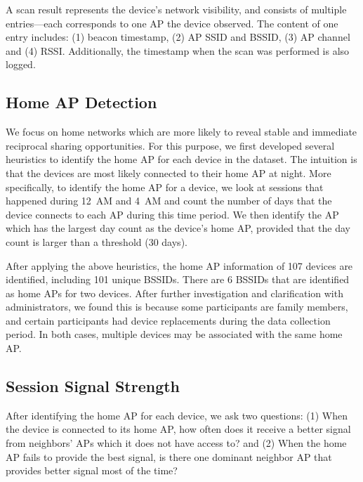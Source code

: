 A \wifi{} scan result represents the device's network visibility, and consists of
multiple entries---each corresponds to one \wifi{} AP the device
observed. The content of one entry includes: (1) beacon timestamp, (2) AP SSID
and BSSID, (3) AP channel and (4) RSSI. Additionally, the timestamp when the
scan was performed is also logged.

\subsection{Home AP Detection}
\label{subsec:homeap}

We focus on home \wifi{} networks which are more likely to reveal stable and
immediate reciprocal sharing opportunities. For this purpose, we first developed
several heuristics to identify the home AP for each device in the dataset. The
intuition is that the devices are most likely connected to their home AP at
night. More specifically, to identify the home AP for a device, we look at
\wifi{} sessions that happened during 12~AM and 4~AM and count the number of
days that the device connects to each AP during this time period. We then
identify the AP which has the largest day count as the device's home AP,
provided that the day count is larger than a threshold (30 days).

After applying the above heuristics, the home AP information of 107 devices are
identified, including 101 unique BSSIDs. There are 6 BSSIDs that are identified
as home APs for two devices. After further investigation and clarification with
\PhoneLab{} administrators, we found this is because some participants are family
members, and certain participants had device replacements during the data
collection period. In both cases, multiple devices may be associated with the
same home AP.

\subsection{\wifi{} Session Signal Strength}
\label{subsec:better}

After identifying the home AP for each device, we ask two questions: (1) When
the device is connected to its home AP, how often does it receive a better signal
from neighbors' APs which it does not have access to? and (2) When the home AP
fails to provide the best signal, is there one dominant neighbor AP 
that provides better signal most of the time?

